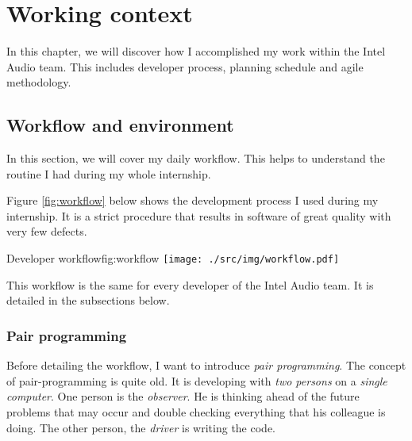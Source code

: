 \chapter{Working context}\label{chap:organisation}

In this chapter, we will discover how I accomplished my work within the Intel Audio team.
This includes developer process, planning schedule and agile methodology.

\section{Workflow and environment}
In this section, we will cover my daily workflow. This helps
to understand the routine I had during my whole internship.

Figure \ref{fig:workflow} below shows the development process I used during my internship.
It is a strict procedure that results in software of great quality with very few defects.

\begin{figureGraphics}{Developer workflow}{fig:workflow}
    \texttt{[image: ./src/img/workflow.pdf]}
\end{figureGraphics}

This workflow is the same for every developer of the Intel Audio team. It is
detailed in the subsections below.

\subsection{Pair programming}
Before detailing the workflow, I want to introduce \emph{pair programming}.
The concept of pair-programming is quite old. It is developing with \emph{two persons} on a \emph{single computer}.
One person is the \emph{observer}. He is thinking ahead of the future problems that may occur and double checking
everything that his colleague is doing. The other person, the \emph{driver} is writing the code.

